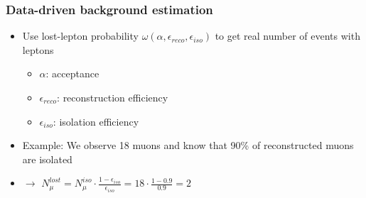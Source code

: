\begin{frame}
  \frametitle{Data-driven background estimation}
  \begin{itemize}
    \item Use lost-lepton probability $\omega(\alpha, \epsilon_{reco}, \epsilon_{iso})$ to get real number of events with leptons 
    \begin{itemize}
      \item $\alpha$: acceptance
      \item $\epsilon_{reco}$: reconstruction efficiency
      \item $\epsilon_{iso}$: isolation efficiency
    \end{itemize}
    \item Example: We observe 18 muons and know that 90\% of reconstructed muons are isolated
    \item $\rightarrow$ $N_\mu^{lost} = N_\mu^{iso} \cdot \frac{1 - \epsilon_{iso}}{\epsilon_{iso}} = 18 \cdot \frac{1 - 0.9}{0.9} = 2$
  \end{itemize}

\end{frame}
